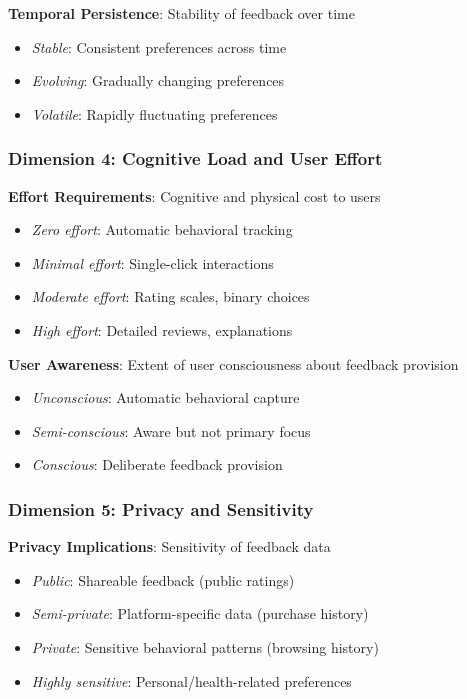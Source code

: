 \textbf{Temporal Persistence}: Stability of feedback over time
\begin{itemize}
    \item \textit{Stable}: Consistent preferences across time
    \item \textit{Evolving}: Gradually changing preferences
    \item \textit{Volatile}: Rapidly fluctuating preferences
\end{itemize}

\subsubsection{Dimension 4: Cognitive Load and User Effort}

\textbf{Effort Requirements}: Cognitive and physical cost to users
\begin{itemize}
    \item \textit{Zero effort}: Automatic behavioral tracking
    \item \textit{Minimal effort}: Single-click interactions
    \item \textit{Moderate effort}: Rating scales, binary choices
    \item \textit{High effort}: Detailed reviews, explanations
\end{itemize}

\textbf{User Awareness}: Extent of user consciousness about feedback provision
\begin{itemize}
    \item \textit{Unconscious}: Automatic behavioral capture
    \item \textit{Semi-conscious}: Aware but not primary focus
    \item \textit{Conscious}: Deliberate feedback provision
\end{itemize}

\subsubsection{Dimension 5: Privacy and Sensitivity}

\textbf{Privacy Implications}: Sensitivity of feedback data
\begin{itemize}
    \item \textit{Public}: Shareable feedback (public ratings)
    \item \textit{Semi-private}: Platform-specific data (purchase history)
    \item \textit{Private}: Sensitive behavioral patterns (browsing history)
    \item \textit{Highly sensitive}: Personal/health-related preferences
\end{itemize}

